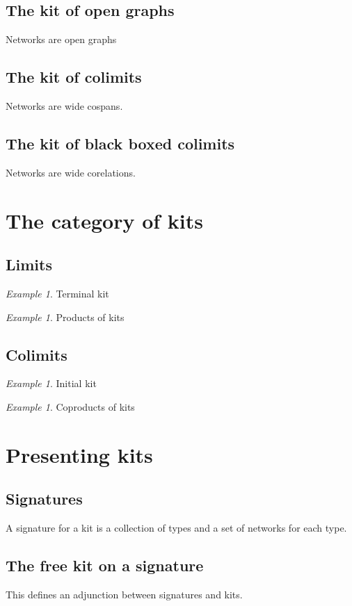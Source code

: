 \documentclass{article}
\theoremstyle{remark}
\newtheorem{example}[definition]{Example}
\begin{document}
\subsection{The kit of open graphs}
Networks are open graphs

\subsection{The kit of colimits}
Networks are wide cospans.

\subsection{The kit of black boxed colimits}
Networks are wide corelations.

\section{The category of kits}

\subsection{Limits}

\begin{example}
Terminal kit
\end{example}

\begin{example}
Products of kits
\end{example}


\subsection{Colimits}
\begin{example}
Initial kit
\end{example}
\begin{example}
Coproducts of kits
\end{example}

\section{Presenting kits}
\subsection{Signatures}
A signature for a kit is a collection of types and a set of networks for each
type.
\subsection{The free kit on a signature}
This defines an adjunction between signatures and kits.
\end{document}
